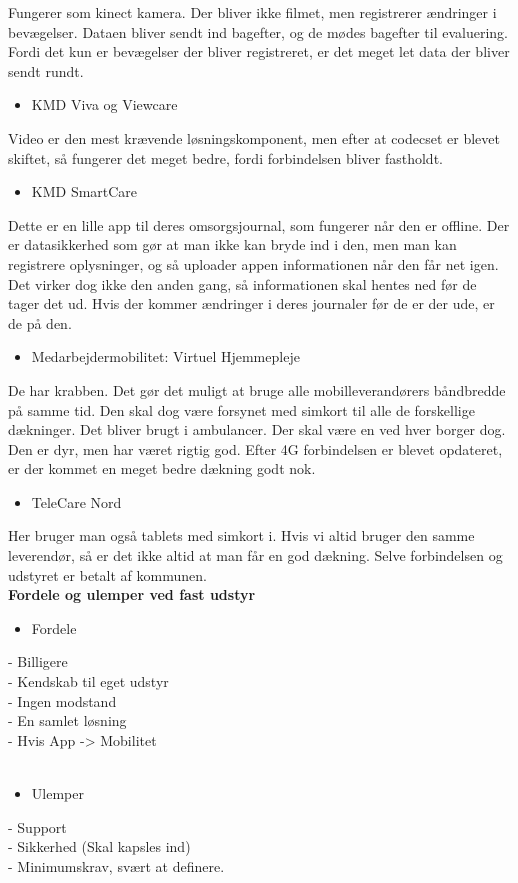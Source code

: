 Fungerer som kinect kamera. Der bliver ikke filmet, men registrerer ændringer i bevægelser. Dataen bliver sendt ind bagefter, og de mødes bagefter til evaluering. Fordi det kun er bevægelser der bliver registreret, er det meget let data der bliver sendt rundt. \\
\begin{itemize}
\item KMD Viva og Viewcare
\end{itemize}
Video er den mest krævende løsningskomponent, men efter at codecset er blevet skiftet, så fungerer det meget bedre, fordi forbindelsen bliver fastholdt.\\ 
\begin{itemize}
\item KMD SmartCare
\end{itemize}
Dette er en lille app til deres omsorgsjournal, som fungerer når den er offline. Der er datasikkerhed som gør at man ikke kan bryde ind i den, men man kan registrere oplysninger, og så uploader appen informationen når den får net igen. Det virker dog ikke den anden gang, så informationen skal hentes ned før de tager det ud. Hvis der kommer ændringer i deres journaler før de er der ude, er de på den.\\
\begin{itemize}
\item Medarbejdermobilitet: Virtuel Hjemmepleje
\end{itemize}
De har krabben. Det gør det muligt at bruge alle mobilleverandørers båndbredde på samme tid. Den skal dog være forsynet med simkort til alle de forskellige dækninger. Det bliver brugt i ambulancer. Der skal være en ved hver borger dog. Den er dyr, men har været rigtig god. Efter 4G forbindelsen er blevet opdateret, er der kommet en meget bedre dækning godt nok. \\
\begin{itemize}
\item TeleCare Nord
\end{itemize}
Her bruger man også tablets med simkort i. Hvis vi altid bruger den samme leverendør, så er det ikke altid at man får en god dækning. Selve forbindelsen og udstyret er betalt af kommunen.\\
\textbf{Fordele og ulemper ved fast udstyr}\\
\begin{itemize}
\item Fordele
\end{itemize}
- Billigere\\
- Kendskab til eget udstyr\\
- Ingen modstand\\
- En samlet løsning\\ 
- Hvis App -> Mobilitet\\
\\
\begin{itemize}
\item Ulemper
\end{itemize}
- Support\\
- Sikkerhed (Skal kapsles ind)\\
- Minimumskrav, svært at definere.\\ 

